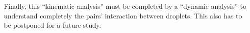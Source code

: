 Finally, this ``kinematic analysis'' must be completed by a ``dynamic analysis'' to understand completely the pairs' interaction between droplets. 
This also has to be postponed for a future study. 



